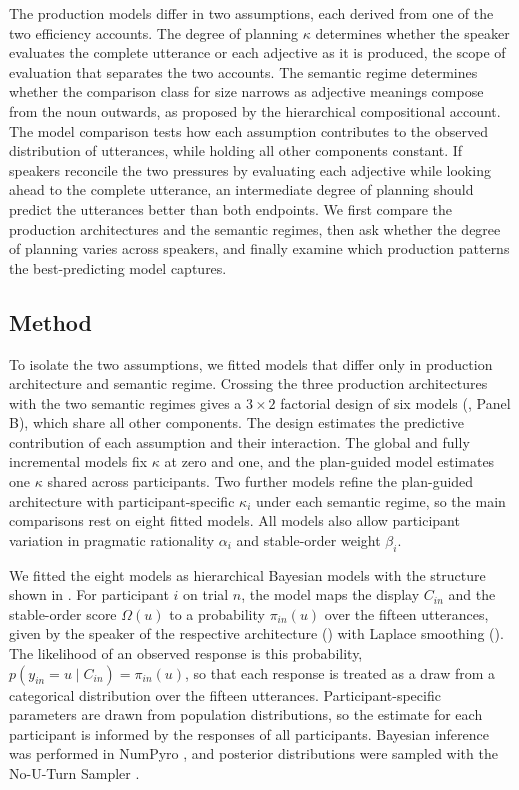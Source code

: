 \documentclass[10pt,a4paper,fleqn]{article}
\begin{document}
The production models differ in two assumptions, each derived from one of the two efficiency accounts.
The degree of planning $\kappa$ determines whether the speaker evaluates the complete utterance or each adjective as it is produced, the scope of evaluation that separates the two accounts.
The semantic regime determines whether the comparison class for size narrows as adjective meanings compose from the noun outwards, as proposed by the hierarchical compositional account.
The model comparison tests how each assumption contributes to the observed distribution of utterances, while holding all other components constant.
If speakers reconcile the two pressures by evaluating each adjective while looking ahead to the complete utterance, an intermediate degree of planning should predict the utterances better than both endpoints.
We first compare the production architectures and the semantic regimes, then ask whether the degree of planning varies across speakers, and finally examine which production patterns the best-predicting model captures.

\subsection{Method}
\label{sec:model:inference}

To isolate the two assumptions, we fitted models that differ only in production architecture and semantic regime.
Crossing the three production architectures with the two semantic regimes gives a $3\times2$ factorial design of six models (, Panel B), which share all other components.
The design estimates the predictive contribution of each assumption and their interaction.
The global and fully incremental models fix $\kappa$ at zero and one, and the plan-guided model estimates one $\kappa$ shared across participants.
Two further models refine the plan-guided architecture with participant-specific $\kappa_i$ under each semantic regime, so the main comparisons rest on eight fitted models.
All models also allow participant variation in pragmatic rationality $\alpha_i$ and stable-order weight $\beta_i$.

We fitted the eight models as hierarchical Bayesian models with the structure shown in .
For participant $i$ on trial $n$, the model maps the display $C_{in}$ and the stable-order score $\Omega(u)$ to a probability $\pi_{in}(u)$ over the fifteen utterances, given by the speaker of the respective architecture () with Laplace smoothing ().
The likelihood of an observed response is this probability, $p(y_{in}=u\mid C_{in})=\pi_{in}(u)$, so that each response is treated as a draw from a categorical distribution over the fifteen utterances.
Participant-specific parameters are drawn from population distributions, so the estimate for each participant is informed by the responses of all participants.
Bayesian inference was performed in NumPyro \citep{phan2019composable}, and posterior distributions were sampled with the No-U-Turn Sampler \citep{hoffman2014no}.
\end{document}
